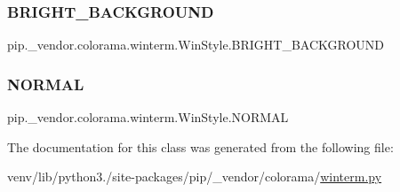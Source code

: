\subsubsection{\texorpdfstring{B\+R\+I\+G\+H\+T\+\_\+\+B\+A\+C\+K\+G\+R\+O\+U\+ND}{BRIGHT\_BACKGROUND}}
{\footnotesize\ttfamily pip.\+\_\+vendor.\+colorama.\+winterm.\+Win\+Style.\+B\+R\+I\+G\+H\+T\+\_\+\+B\+A\+C\+K\+G\+R\+O\+U\+ND\hspace{0.3cm}{\ttfamily [static]}}

\mbox{\label{classpip_1_1__vendor_1_1colorama_1_1winterm_1_1WinStyle_a556472636c48529f8aed8a55b4c0d746}} 
\subsubsection{\texorpdfstring{N\+O\+R\+M\+AL}{NORMAL}}
{\footnotesize\ttfamily pip.\+\_\+vendor.\+colorama.\+winterm.\+Win\+Style.\+N\+O\+R\+M\+AL\hspace{0.3cm}{\ttfamily [static]}}



The documentation for this class was generated from the following file\+:\begin{DoxyCompactItemize}
\item 
venv/lib/python3./site-\/packages/pip/\+\_\+vendor/colorama/\hyperlink{winterm_8py}{winterm.\+py}\end{DoxyCompactItemize}

